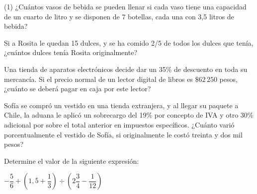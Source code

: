 \documentclass[]{srs}
\begin{document}
\begin{preguntas}(1)
  \pregunta ¿Cuántos vasos de bebida se pueden llenar si cada vaso tiene una
  capacidad de un cuarto de litro y se disponen de 7 botellas, cada
  una con 3,5 litros de bebida?
  \begin{malla}[height=7cm]
  \end{malla}
  \pregunta Si a Rosita le quedan 15 dulces, y se ha comido 2/5 de todos los dulces que tenía,
  ¿cuántos dulces tenía Rosita originalmente?
  \begin{malla}[height=7cm]
  \end{malla}
  \pregunta Una tienda de aparatos electrónicos decide dar un 35\% de descuento en toda su mercancía.
  Si el precio normal de un lector digital de libros es $\$62\, 250$ pesos,
  ¿cuánto se deberá pagar en caja por este lector?
  \begin{malla}[height=7cm]
  \end{malla}

  \pregunta Sofía se compró un vestido en una tienda extranjera, y al llegar su paquete
  a Chile, la aduana le aplicó un sobrecargo del 19\% por concepto de IVA y otro 30\% adicional
  por sobre el total anterior en impuestos específicos.
  ¿Cuánto varió porcentualmente el vestido de Sofía,
  si originalmente le costó treinta y dos mil pesos?
  \begin{malla}[height=7cm]
  \end{malla}

  \pregunta Determine el valor de la siguiente expresión:
  \begin{doteado}
  \(  -\dfrac{5}{6} +\left(1,\overline{5}+\dfrac{1}{3}\right)\div\left(2\dfrac{3}{4}-\dfrac{1}{12}\right) \)
  \end{doteado}
  \begin{malla}[height=14cm]
  \end{malla}


\end{preguntas}
\end{document}
